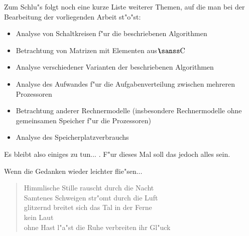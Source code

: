 

Zum Schlu"s folgt noch eine kurze Liste weiterer Themen, auf die man bei der 
Bearbeitung der vorliegenden Arbeit st"o"st:

\begin{itemize}
\item Analyse von Schaltkreisen f"ur die beschriebenen Algorithmen
\item Betrachtung von Matrizen mit Elementen aus $\Complex$
\item Analyse verschiedener Varianten der beschriebenen Algorithmen
\item Analyse des Aufwandes f"ur die Aufgabenverteilung zwischen mehreren
      Prozessoren
\item Betrachtung anderer Rechnermodelle (insbesondere Rechnermodelle
      ohne gemeinsamen Speicher f"ur die Prozessoren)
\item Analyse des Speicherplatzverbrauchs
\end{itemize}

Es bleibt also einiges zu tun... . F"ur dieses Mal soll das jedoch alles 
sein.
\vspace{5ex}

Wenn die Gedanken wieder leichter flie"sen...
\begin{verse}
    Himmlische Stille rauscht durch die Nacht \\
    Samtenes Schweigen str"omt durch die Luft \\
    glitzernd breitet sich das Tal in der Ferne \\[2ex]
    
    kein Laut \\
    ohne Hast l"a"st die Ruhe verbreiten ihr Gl"uck
\end{verse}

